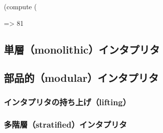 \documentclass[11pt, oneside]{jsarticle}   	%
\begin{document}
(compute (%

=> 81













\subsection{単層（monolithic）インタプリタ}
\subsection{部品的（modular）インタプリタ}











\subsubsection{インタプリタの持ち上げ（lifting）}







\subsubsection{多階層（stratified）インタプリタ}
\end{document}
